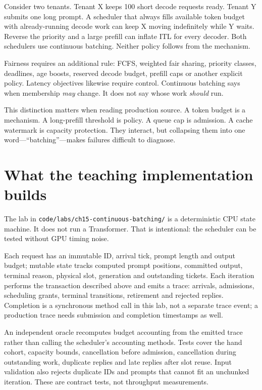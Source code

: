 Consider two tenants. Tenant X keeps 100 short decode requests ready. Tenant Y
submits one long prompt. A scheduler that always fills available token budget
with already-running decode work can keep X moving indefinitely while Y waits.
Reverse the priority and a large prefill can inflate ITL for every decoder.
Both schedulers use continuous batching. Neither policy follows from the
mechanism.

Fairness requires an additional rule: FCFS, weighted fair sharing, priority
classes, deadlines, age boosts, reserved decode budget, prefill caps or another
explicit policy. Latency objectives likewise require control. Continuous
batching says when membership \emph{may} change. It does not say whose work
\emph{should} run.

This distinction matters when reading production source. A token budget is a
mechanism. A long-prefill threshold is policy. A queue cap is admission. A
cache watermark is capacity protection. They interact, but collapsing them
into one word---``batching''---makes failures difficult to diagnose.

\section{What the teaching implementation builds}

The lab in \texttt{code/labs/ch15-continuous-batching/} is a deterministic
CPU state machine. It does not run a Transformer. That is intentional: the
scheduler can be tested without GPU timing noise.

Each request has an immutable ID, arrival tick, prompt length and output
budget; mutable state tracks computed prompt positions, committed output,
terminal reason, physical slot, generation and outstanding tickets. Each
iteration performs the transaction described above and emits a trace:
arrivals, admissions, scheduling grants, terminal transitions, retirement and
rejected replies. Completion is a synchronous method call in this lab, not
a separate trace event; a production trace needs submission and completion
timestamps as well.

An independent oracle recomputes budget accounting from the emitted trace
rather than calling the scheduler's accounting methods. Tests cover the hand
cohort, capacity bounds, cancellation before admission, cancellation during
outstanding work, duplicate replies and late replies after slot reuse.
Input validation also rejects duplicate IDs and prompts that cannot fit
an unchunked iteration. These are contract tests, not throughput measurements.

